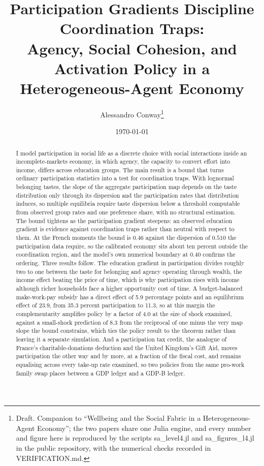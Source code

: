 \documentclass[11pt]{article}
\title{Participation Gradients Discipline Coordination Traps:\\ Agency, Social Cohesion, and Activation Policy in a Heterogeneous-Agent Economy}
\author{Alessandro Conway\thanks{Draft. Companion to ``Wellbeing and the Social Fabric in a Heterogeneous-Agent Economy''; the two papers share one Julia engine, and every number and figure here is reproduced by the scripts sa\_level4.jl and sa\_figures\_l4.jl in the public repository, with the numerical checks recorded in VERIFICATION.md.}}
\date{\today}
\begin{document}
\maketitle

\begin{abstract}
\noindent I model participation in social life as a discrete choice with social interactions inside an incomplete-markets economy, in which agency, the capacity to convert effort into income, differs across education groups. The main result is a bound that turns ordinary participation statistics into a test for coordination traps. With lognormal belonging tastes, the slope of the aggregate participation map depends on the taste distribution only through its dispersion and the participation rates that distribution induces, so multiple equilibria require taste dispersion below a threshold computable from observed group rates and one preference share, with no structural estimation. The bound tightens as the participation gradient steepens: an observed education gradient is evidence against coordination traps rather than neutral with respect to them. At the French moments the bound is $0.46$ against the dispersion of $0.510$ the participation data require, so the calibrated economy sits about ten percent outside the coordination region, and the model's own numerical boundary at $0.40$ confirms the ordering. Three results follow. The education gradient in participation divides roughly two to one between the taste for belonging and agency operating through wealth, the income effect beating the price of time, which is why participation rises with income although richer households face a higher opportunity cost of time. A budget-balanced make-work-pay subsidy has a direct effect of 5.9 percentage points and an equilibrium effect of 23.9, from 35.3 percent participation to 11.3, so at this margin the complementarity amplifies policy by a factor of 4.0 at the size of shock examined, against a small-shock prediction of 8.3 from the reciprocal of one minus the very map slope the bound constrains, which ties the policy result to the theorem rather than leaving it a separate simulation. And a participation tax credit, the analogue of France's charitable-donations deduction and the United Kingdom's Gift Aid, moves participation the other way and by more, at a fraction of the fiscal cost, and remains equalising across every take-up rate examined, so two policies from the same pro-work family swap places between a GDP ledger and a GDP-B ledger.
\end{abstract}
\end{document}
